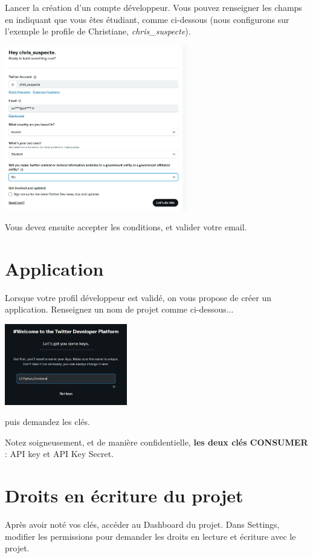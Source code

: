 \documentclass[11pt,a4paper]{article}
\begin{document}
Lancer la création d'un compte développeur. Vous pouvez renseigner les champs en indiquant que vous êtes étudiant, comme ci-dessous (nous configurons sur l'exemple le profile de Christiane, \emph{chris\_suspecte}). 

\begin{center}
    \includegraphics[width=0.6\textwidth]{etapes_cle/step2.jpg}
\end{center}

Vous devez ensuite accepter les conditions, et valider votre email. 
\newpage
\section{Application}

Lorsque votre profil développeur est validé, on vous propose de créer un application. Renseignez un nom de projet comme ci-dessous...
\begin{center}
    \includegraphics[width=0.4\textwidth]{etapes_cle/step3.jpg}
\end{center}
puis demandez les clés. 

Notez soigneusement, et de manière confidentielle, \textbf{les deux clés CONSUMER} : API key et API Key Secret.

\section{Droits en écriture du projet}
Après avoir noté vos clés, accéder au Dashboard du projet. Dans Settings, modifier les permissions pour demander les droits en lecture et écriture avec le projet. 
\end{document}
